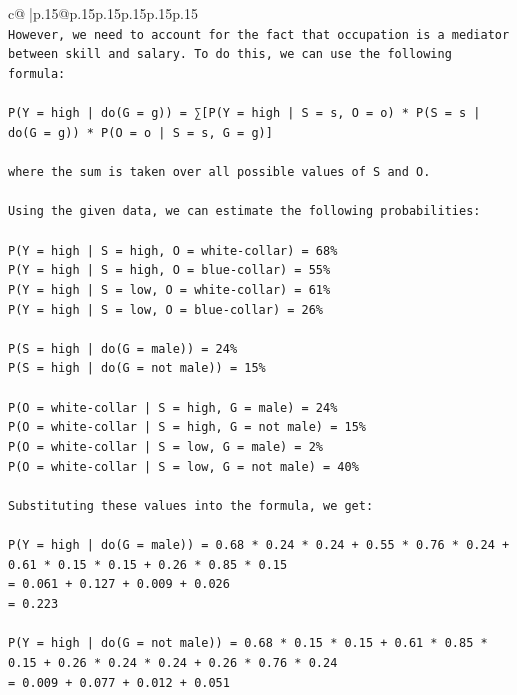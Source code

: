 \documentclass{article}
\begin{document}
{\begin{supertabular}{c@{$\;$}|p{.15\linewidth}@{}p{.15\linewidth}p{.15\linewidth}p{.15\linewidth}p{.15\linewidth}p{.15\linewidth}}
{{{\\ 
\texttt{However, we need to account for the fact that occupation is a mediator between skill and salary. To do this, we can use the following formula:} \\
\\ 
\texttt{P(Y = high | do(G = g)) = ∑{[}P(Y = high | S = s, O = o) * P(S = s | do(G = g)) * P(O = o | S = s, G = g){]}} \\
\\ 
\texttt{where the sum is taken over all possible values of S and O.} \\
\\ 
\texttt{Using the given data, we can estimate the following probabilities:} \\
\\ 
\texttt{P(Y = high | S = high, O = white{-}collar) = 68\%} \\
\texttt{P(Y = high | S = high, O = blue{-}collar) = 55\%} \\
\texttt{P(Y = high | S = low, O = white{-}collar) = 61\%} \\
\texttt{P(Y = high | S = low, O = blue{-}collar) = 26\%} \\
\\ 
\texttt{P(S = high | do(G = male)) = 24\%} \\
\texttt{P(S = high | do(G = not male)) = 15\%} \\
\\ 
\texttt{P(O = white{-}collar | S = high, G = male) = 24\%} \\
\texttt{P(O = white{-}collar | S = high, G = not male) = 15\%} \\
\texttt{P(O = white{-}collar | S = low, G = male) = 2\%} \\
\texttt{P(O = white{-}collar | S = low, G = not male) = 40\%} \\
\\ 
\texttt{Substituting these values into the formula, we get:} \\
\\ 
\texttt{P(Y = high | do(G = male)) = 0.68 * 0.24 * 0.24 + 0.55 * 0.76 * 0.24 + 0.61 * 0.15 * 0.15 + 0.26 * 0.85 * 0.15} \\
\texttt{= 0.061 + 0.127 + 0.009 + 0.026} \\
\texttt{= 0.223} \\
\\ 
\texttt{P(Y = high | do(G = not male)) = 0.68 * 0.15 * 0.15 + 0.61 * 0.85 * 0.15 + 0.26 * 0.24 * 0.24 + 0.26 * 0.76 * 0.24} \\
\texttt{= 0.009 + 0.077 + 0.012 + 0.051} \\
}}}
\end{supertabular}}
\end{document}

